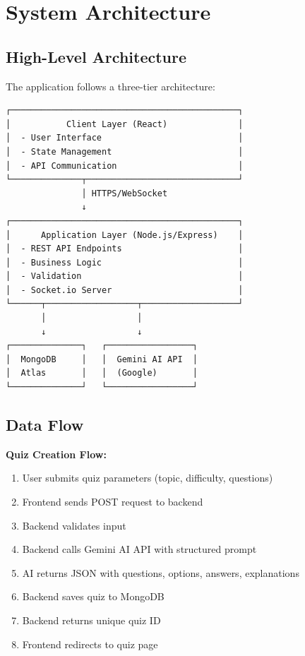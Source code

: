 \documentclass[12pt,a4paper]{article}
\begin{document}
\newpage

\section{System Architecture}

\subsection{High-Level Architecture}

The application follows a three-tier architecture:

\begin{verbatim}
┌─────────────────────────────────────────────┐
│           Client Layer (React)              │
│  - User Interface                           │
│  - State Management                         │
│  - API Communication                        │
└──────────────┬──────────────────────────────┘
               │ HTTPS/WebSocket
               ↓
┌─────────────────────────────────────────────┐
│      Application Layer (Node.js/Express)    │
│  - REST API Endpoints                       │
│  - Business Logic                           │
│  - Validation                               │
│  - Socket.io Server                         │
└──────┬──────────────────┬───────────────────┘
       │                  │
       ↓                  ↓
┌──────────────┐   ┌─────────────────┐
│  MongoDB     │   │  Gemini AI API  │
│  Atlas       │   │  (Google)       │
└──────────────┘   └─────────────────┘
\end{verbatim}

\subsection{Data Flow}

\textbf{Quiz Creation Flow:}
\begin{enumerate}
    \item User submits quiz parameters (topic, difficulty, questions)
    \item Frontend sends POST request to backend
    \item Backend validates input
    \item Backend calls Gemini AI API with structured prompt
    \item AI returns JSON with questions, options, answers, explanations
    \item Backend saves quiz to MongoDB
    \item Backend returns unique quiz ID
    \item Frontend redirects to quiz page
\end{enumerate}
\end{document}
